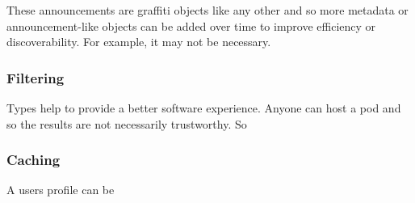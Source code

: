 These announcements are graffiti objects like any other and so more metadata
or announcement-like objects can be added over time to improve efficiency or
discoverability. For example, it may not be necessary.

\subsubsection{Filtering}

Types help to provide a better software experience.
Anyone can host a pod and so the results are not necessarily trustworthy.
So

\subsubsection{Caching}

A users profile can be
